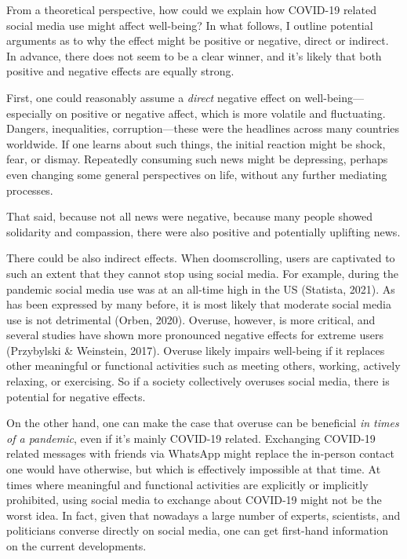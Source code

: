 \documentclass[
  english,
  man,mask,floatsintext]{apa6}
\begin{document}
From a theoretical perspective, how could we explain how COVID-19 related social media use might affect well-being?
In what follows, I outline potential arguments as to why the effect might be positive or negative, direct or indirect.
In advance, there does not seem to be a clear winner, and it's likely that both positive and negative effects are equally strong.

First, one could reasonably assume a \emph{direct} negative effect on well-being---especially on positive or negative affect, which is more volatile and fluctuating.
Dangers, inequalities, corruption---these were the headlines across many countries worldwide.
If one learns about such things, the initial reaction might be shock, fear, or dismay.
Repeatedly consuming such news might be depressing, perhaps even changing some general perspectives on life, without any further mediating processes.

That said, because not all news were negative, because many people showed solidarity and compassion, there were also positive and potentially uplifting news.

There could be also indirect effects.
When doomscrolling, users are captivated to such an extent that they cannot stop using social media.
For example, during the pandemic social media use was at an all-time high in the US (Statista, 2021).
As has been expressed by many before, it is most likely that moderate social media use is not detrimental (Orben, 2020).
Overuse, however, is more critical, and several studies have shown more pronounced negative effects for extreme users (Przybylski \& Weinstein, 2017).
Overuse likely impairs well-being if it replaces other meaningful or functional activities such as meeting others, working, actively relaxing, or exercising.
So if a society collectively overuses social media, there is potential for negative effects.

On the other hand, one can make the case that overuse can be beneficial \emph{in times of a pandemic}, even if it's mainly COVID-19 related.
Exchanging COVID-19 related messages with friends via WhatsApp might replace the in-person contact one would have otherwise, but which is effectively impossible at that time.
At times where meaningful and functional activities are explicitly or implicitly prohibited, using social media to exchange about COVID-19 might not be the worst idea.
In fact, given that nowadays a large number of experts, scientists, and politicians converse directly on social media, one can get first-hand information on the current developments.
\end{document}
